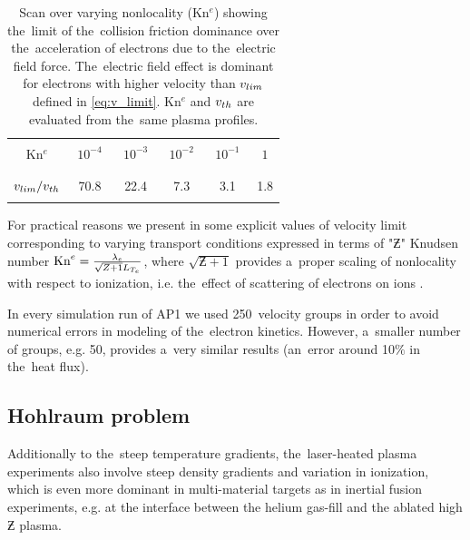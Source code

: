 \begin{table}
\begin{center}
  \begin{tabular}{c|ccccc}
    \hline\hline\\
    Kn$^e$ & $\,\,10^{-4}\,\,$ & $\,\,10^{-3}\,\,$ & $\,\,10^{-2}\,\,$ & $\,\,10^{-1}\,\,$ & $\,\,1\,\,$ \\\\
    \hline\\
    $v_{lim} / v_{th}$ & 70.8 & 22.4 & 7.3 & 3.1 & 1.8\\\\
    \hline\hline
  \end{tabular}
  \caption{
  Scan over varying nonlocality (Kn$^e$) showing the~limit of 
  the~collision friction dominance over the~acceleration of electrons 
  due to the~electric field force. The~electric field effect is dominant
  for electrons with higher velocity than $v_{lim}$ defined in 
  \eqref{eq:v_limit}. Kn$^e$ and $v_{th}$ are evaluated from the~same 
  plasma profiles.
  }
\label{tab:vlim}
\end{center}
\end{table}

For practical reasons we present in  
some explicit values of velocity limit corresponding to varying transport 
conditions expressed in terms of "$\Zbar$" Knudsen number 
$\text{Kn}^e = \frac{\lambda_e}{\sqrt{Z + 1}L_{T_e}}$, 
where $\sqrt{\Zbar + 1}$ provides a~proper scaling of nonlocality with respect
to ionization, i.e. the~effect of scattering of electrons on ions 
\cite{LMV_1983_7}.

In every simulation run of AP1 we used 250~velocity groups in order to avoid
numerical errors in modeling of the~electron kinetics. However, a~smaller 
number of groups, e.g. 50, provides a~very similar results 
(an~error around 10$\%$ in the~heat flux).

\subsection{Hohlraum problem}
Additionally to the~steep temperature gradients, the~laser-heated plasma 
experiments also involve steep density gradients and variation in ionization,
which is even more dominant in multi-material targets as in inertial
fusion experiments, e.g. at the interface between the helium gas-fill and 
the ablated high $\Zbar$ plasma.

